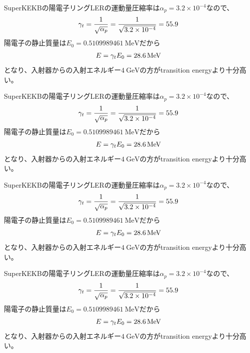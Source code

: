 \documentclass[]{jlreq}
\begin{document}
\begin{tcolorbox}[title=\textgt{SuperKEKBのシンクロトロン周波数}, breakable = true]
  SuperKEKBの陽電子リングLERの運動量圧縮率は$\alpha_p = 3.2 \times 10^{-4}$なので、
  \begin{equation}
    \gamma_t = \frac{1}{\sqrt{\alpha_p}}= \frac{1}{\sqrt{3.2 \times 10^{-4}}} = 55.9 \notag
  \end{equation}
  陽電子の静止質量は$E_0 = \SI{0.5109989461}{\mega\electronvolt}$だから
  \begin{equation}
    E = \gamma_t E_0 = \SI{28.6}{\mega\electronvolt} \notag
  \end{equation}
  となり、入射器からの入射エネルギー$\SI{4}{\giga\electronvolt}$の方がtransition energyより十分高い。

  SuperKEKBの陽電子リングLERの運動量圧縮率は$\alpha_p = 3.2 \times 10^{-4}$なので、
  \begin{equation}
    \gamma_t = \frac{1}{\sqrt{\alpha_p}}= \frac{1}{\sqrt{3.2 \times 10^{-4}}} = 55.9 \notag
  \end{equation}
  陽電子の静止質量は$E_0 = \SI{0.5109989461}{\mega\electronvolt}$だから
  \begin{equation}
    E = \gamma_t E_0 = \SI{28.6}{\mega\electronvolt} \notag
  \end{equation}
  となり、入射器からの入射エネルギー$\SI{4}{\giga\electronvolt}$の方がtransition energyより十分高い。

  SuperKEKBの陽電子リングLERの運動量圧縮率は$\alpha_p = 3.2 \times 10^{-4}$なので、
  \begin{equation}
    \gamma_t = \frac{1}{\sqrt{\alpha_p}}= \frac{1}{\sqrt{3.2 \times 10^{-4}}} = 55.9 \notag
  \end{equation}
  陽電子の静止質量は$E_0 = \SI{0.5109989461}{\mega\electronvolt}$だから
  \begin{equation}
    E = \gamma_t E_0 = \SI{28.6}{\mega\electronvolt} \notag
  \end{equation}
  となり、入射器からの入射エネルギー$\SI{4}{\giga\electronvolt}$の方がtransition energyより十分高い。

  SuperKEKBの陽電子リングLERの運動量圧縮率は$\alpha_p = 3.2 \times 10^{-4}$なので、
  \begin{equation}
    \gamma_t = \frac{1}{\sqrt{\alpha_p}}= \frac{1}{\sqrt{3.2 \times 10^{-4}}} = 55.9 \notag
  \end{equation}
  陽電子の静止質量は$E_0 = \SI{0.5109989461}{\mega\electronvolt}$だから
  \begin{equation}
    E = \gamma_t E_0 = \SI{28.6}{\mega\electronvolt} \notag
  \end{equation}
  となり、入射器からの入射エネルギー$\SI{4}{\giga\electronvolt}$の方がtransition energyより十分高い。
\end{tcolorbox}
\end{document}
